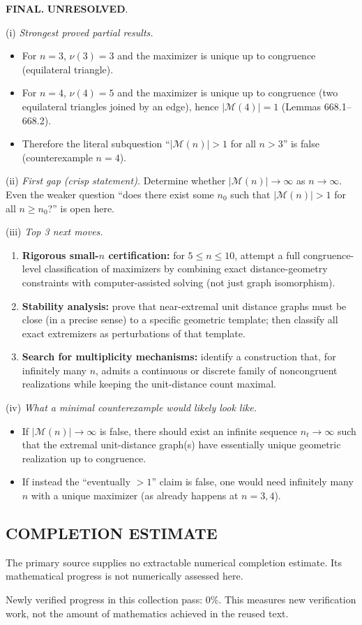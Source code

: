 \bigskip
\noindent\textbf{FINAL.} \textbf{UNRESOLVED}.

\smallskip
\noindent(i) \emph{Strongest proved partial results.}
\begin{itemize}
\item For $n=3$, $\nu(3)=3$ and the maximizer is unique up to congruence (equilateral triangle).
\item For $n=4$, $\nu(4)=5$ and the maximizer is unique up to congruence (two equilateral triangles joined by an edge), hence $|\mathcal{M}(4)|=1$ (Lemmas 668.1--668.2).
\item Therefore the literal subquestion ``$|\mathcal{M}(n)|>1$ for all $n>3$'' is false (counterexample $n=4$).
\end{itemize}

\noindent(ii) \emph{First gap (crisp statement).}
Determine whether $|\mathcal{M}(n)|\to\infty$ as $n\to\infty$.
Even the weaker question ``does there exist some $n_0$ such that $|\mathcal{M}(n)|>1$ for all $n\ge n_0$?'' is open here.

\noindent(iii) \emph{Top 3 next moves.}
\begin{enumerate}
\item \textbf{Rigorous small-$n$ certification:} for $5\le n\le 10$, attempt a full congruence-level classification of maximizers by combining exact distance-geometry constraints with computer-assisted solving (not just graph isomorphism).
\item \textbf{Stability analysis:} prove that near-extremal unit distance graphs must be close (in a precise sense) to a specific geometric template; then classify all exact extremizers as perturbations of that template.
\item \textbf{Search for multiplicity mechanisms:} identify a construction that, for infinitely many $n$, admits a continuous or discrete family of noncongruent realizations while keeping the unit-distance count maximal.
\end{enumerate}

\noindent(iv) \emph{What a minimal counterexample would likely look like.}
\begin{itemize}
\item If $|\mathcal{M}(n)|\to\infty$ is false, there should exist an infinite sequence $n_t\to\infty$ such that the extremal unit-distance graph(s) have essentially unique geometric realization up to congruence.
\item If instead the ``eventually $>1$'' claim is false, one would need infinitely many $n$ with a unique maximizer (as already happens at $n=3,4$).
\end{itemize}




\subsection*{COMPLETION ESTIMATE}
The primary source supplies no extractable numerical completion estimate. Its mathematical progress is not numerically assessed here.

Newly verified progress in this collection pass: $0\%$. This measures new verification work, not the amount of mathematics achieved in the reused text.

